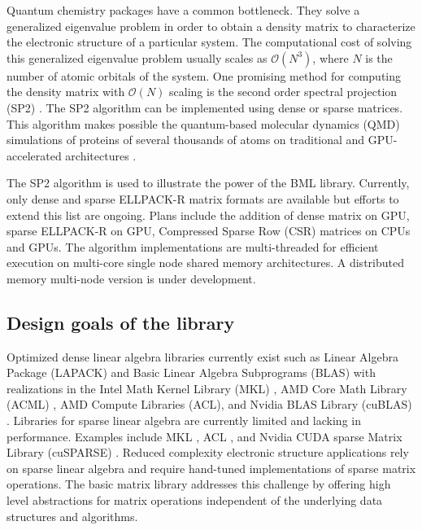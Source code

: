 Quantum chemistry packages have a common bottleneck.  They solve a generalized eigenvalue problem in order to obtain a density matrix to characterize the electronic structure of a particular system. The computational cost of solving this generalized eigenvalue problem usually scales as $\mathcal{O}(N^3)$, where $N$ is the number of atomic orbitals of the system. One promising method for computing the density matrix with $\mathcal{O}(N)$ scaling is the second order spectral projection (SP2) \cite{ANiklasson02}. The SP2 algorithm can be implemented using dense or sparse matrices. This algorithm makes possible the quantum-based molecular dynamics (QMD) simulations of proteins of several thousands of atoms on traditional \cite{Mniszewski2015,Negre2016} and GPU-accelerated architectures \cite{MCawkwell_GPU,MCawkwell_MultGPU}. 

The SP2 algorithm is used to illustrate the power of the BML library. Currently, only dense and sparse ELLPACK-R matrix formats are available but efforts to extend this list are ongoing. Plans include the addition of dense matrix on GPU, sparse ELLPACK-R on GPU, Compressed Sparse Row (CSR) matrices on CPUs and GPUs. The algorithm 
implementations are multi-threaded for efficient execution on multi-core single node shared memory architectures. 
A distributed memory multi-node version is under development.

\subsection{Design goals of the library}
\label{design}

Optimized dense linear algebra libraries currently exist such as Linear Algebra Package (LAPACK) \cite{lapack} and Basic Linear Algebra Subprograms (BLAS) \cite{MDayde95} with realizations in
the Intel Math Kernel Library (MKL) \cite{mkl}, AMD Core Math Library (ACML) \cite{acml}, AMD Compute Libraries (ACL)\cite{acl}, and Nvidia BLAS Library (cuBLAS) \cite{cublas}. Libraries for sparse linear algebra are currently limited and lacking in performance. Examples include MKL \cite{mkl}, ACL \cite{acl}, and Nvidia CUDA sparse Matrix Library (cuSPARSE) \cite{cusparse}. Reduced complexity electronic structure applications rely on sparse linear algebra and require hand-tuned implementations of sparse matrix operations.
The basic matrix library addresses this challenge by offering high level abstractions for matrix operations independent of the underlying data structures and algorithms.

